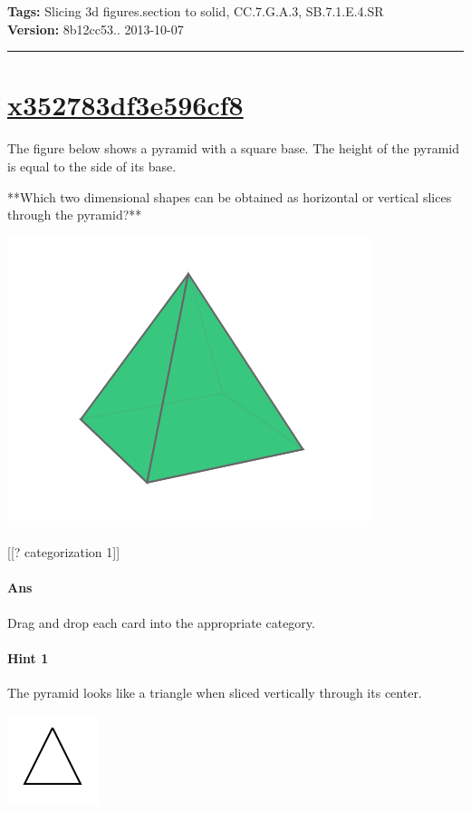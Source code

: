 \documentclass[twocolumn,10pt]{article}
\def\shrinkfactor{0.55}
\begin{document}
\medskip
\noindent
\textbf{Tags:} {\footnotesize Slicing 3d figures.section to solid, CC.7.G.A.3, SB.7.1.E.4.SR}\\
\textbf{Version:} 8b12cc53.. 2013-10-07
\smallskip\hrule





\section{\href{https://www.khanacademy.org/devadmin/content/items/x352783df3e596cf8}{x352783df3e596cf8}}

\noindent
The figure below shows a pyramid with a square base. The height of the pyramid is equal to the side of its base. 

**Which two dimensional shapes can be obtained as  horizontal or vertical slices through the pyramid?**  


\includegraphics[scale=\shrinkfactor]{figures/1d9b248d33b33b47f6b0bcbfae27cf51e2c208c7.png}

[[? categorization 1]]

\paragraph{Ans} Drag and drop each card into the appropriate category. 

\paragraph{Hint 1}The pyramid looks like a triangle when sliced vertically through its center.  

\includegraphics[scale=\shrinkfactor]{figures/d443e0deb4dc18ef30fbf9139d310266f460b66b.png}
\end{document}
